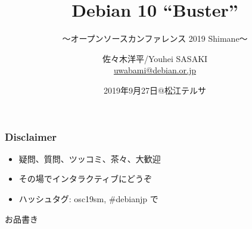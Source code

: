 \documentclass[cjk,c,squeeze,shrink,dvipdfmx,12pt,handout]{beamer}
\title[Buster]{Debian 10 ``Buster''}
\subtitle[OSC 2019 Shimane]{%
  〜オープンソースカンファレンス 2019 Shimane〜%
}
\author[ささき]{%
  佐々木洋平/Youhei SASAKI\\[1em]
  \href{mailto:uwabami@debian.or.jp}{uwabami@debian.or.jp}
}
\institute[Debian JP Project]{%
  {\footnotesize{%
      Debian JP Project/関西Debian勉強会
    }}
}
\date[2019/09/27]{%
  {\footnotesize{2019年9月27日@松江テルサ}}
}
\begin{document}
\takahashi[80]{　}
{%
  \begin{frame}
    \maketitle
  \end{frame}
}
\begin{frame}[fragile]
  \frametitle{Disclaimer}
  \begin{itemize}
  \item 疑問、質問、ツッコミ、茶々、\alert{大歓迎}
  \item その場でインタラクティブにどうぞ
  \item ハッシュタグ: \alert{osc19sm}, \alert{\#debianjp} で
  \end{itemize}
\end{frame}
\begin{frame}{お品書き}
  \tableofcontents
\end{frame}
\end{document}
